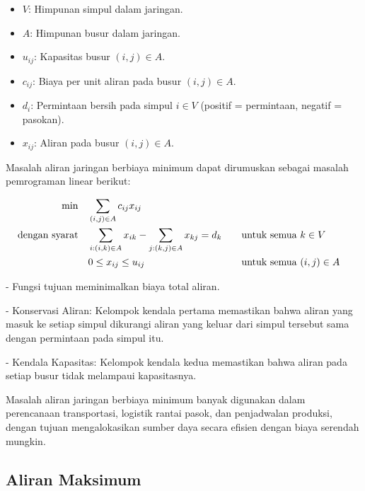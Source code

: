 \begin{itemize}
\item \( V \): Himpunan simpul dalam jaringan.
\item \( A \): Himpunan busur dalam jaringan.
\end{itemize}

\begin{itemize}
\item \( u_{ij} \): Kapasitas busur \( (i, j) \in A \).
\item \( c_{ij} \): Biaya per unit aliran pada busur \( (i, j) \in A \).
\item \( d_i \): Permintaan bersih pada simpul \( i \in V \) (positif = permintaan, negatif = pasokan).
\end{itemize}

\begin{itemize}
\item \( x_{ij} \): Aliran pada busur \( (i, j) \in A \).
\end{itemize}

Masalah aliran jaringan berbiaya minimum dapat dirumuskan sebagai masalah pemrograman linear berikut:

\begin{align*}
\min \quad & \sum_{(i, j) \in A} c_{ij} x_{ij} \\
\mbox{dengan syarat}\quad        & \sum_{i:(i, k) \in A} x_{ik} - \sum_{j:(k, j) \in A} x_{kj} = d_k &&\quad \mbox{untuk semua } k \in V \\
& 0 \leq x_{ij} \leq u_{ij} &&\quad \mbox{untuk semua } (i, j) \in A
\end{align*}

- Fungsi tujuan meminimalkan biaya total aliran.

- Konservasi Aliran: Kelompok kendala pertama memastikan bahwa aliran yang masuk ke setiap simpul dikurangi aliran yang keluar dari simpul tersebut sama dengan permintaan pada simpul itu.

- Kendala Kapasitas: Kelompok kendala kedua memastikan bahwa aliran pada setiap busur tidak melampaui kapasitasnya.

Masalah aliran jaringan berbiaya minimum banyak digunakan dalam perencanaan transportasi, logistik rantai pasok, dan penjadwalan produksi, dengan tujuan mengalokasikan sumber daya secara efisien dengan biaya serendah mungkin.

\subsection{Aliran Maksimum}
\label{sec:max-flow}

